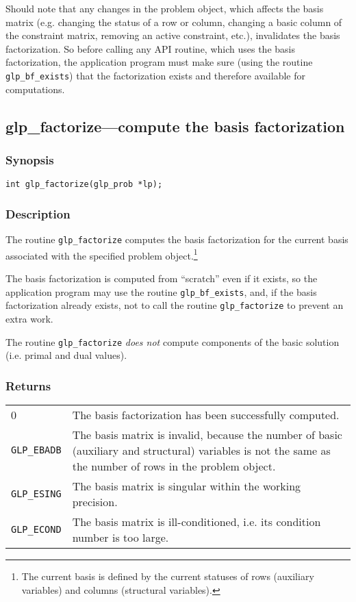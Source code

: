 Should note that any changes in the problem object, which affects the
basis matrix (e.g. changing the status of a row or column, changing
a basic column of the constraint matrix, removing an active constraint,
etc.), invalidates the basis factorization. So before calling any API
routine, which uses the basis factorization, the application program
must make sure (using the routine \verb|glp_bf_exists|) that the
factorization exists and therefore available for computations.


\subsection{glp\_factorize---compute the basis factorization}

\subsubsection*{Synopsis}

\begin{verbatim}
int glp_factorize(glp_prob *lp);
\end{verbatim}

\subsubsection*{Description}

The routine \verb|glp_factorize| computes the basis factorization for
the current basis associated with the specified problem
object.\footnote{The current basis is defined by the current statuses
of rows (auxiliary variables) and columns (structural variables).}

The basis factorization is computed from ``scratch'' even if it exists,
so the application program may use the routine \verb|glp_bf_exists|,
and, if the basis factorization already exists, not to call the routine
\verb|glp_factorize| to prevent an extra work.

The routine \verb|glp_factorize| {\it does not} compute components of
the basic solution (i.e. primal and dual values).

\subsubsection*{Returns}

\begin{tabular}{@{}p{25mm}p{97.3mm}@{}}
0 & The basis factorization has been successfully computed.\\
\verb|GLP_EBADB| & The basis matrix is invalid, because the number of
basic (auxiliary and structural) variables is not the same as the number
of rows in the problem object.\\
\verb|GLP_ESING| & The basis matrix is singular within the working
precision.\\
\verb|GLP_ECOND| & The basis matrix is ill-conditioned, i.e. its
condition number is too large.\\
\end{tabular}

